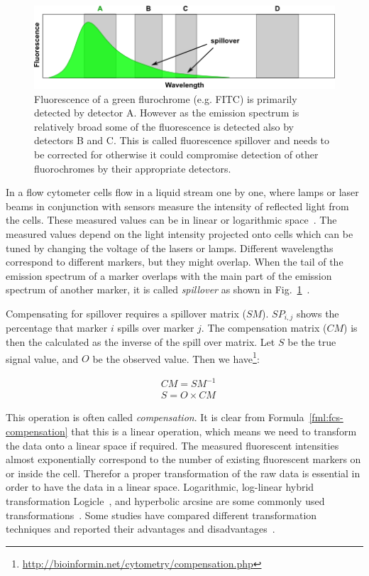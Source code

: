 \begin{figure}[!ht]
  \centering
  \includegraphics[width=.8\textwidth]{figs/FITC_spillover_onLSRII_s}
  \caption[Flow Cytometry Spillover Effect]{Fluorescence of a green flurochrome (e.g. FITC) is primarily detected by detector A. However as the emission spectrum is relatively broad some of the fluorescence is detected also by detectors B and C. This is called fluorescence spillover and needs to be corrected for otherwise it could compromise detection of other fluorochromes by their appropriate detectors\footnotemark[1].}
  \label{fig:flow-cytometry-spillover}
\end{figure}

In a flow cytometer cells flow in a liquid stream one by one, where lamps or laser beams in conjunction with sensors measure the intensity of reflected light from the cells. These measured values can be in linear or logarithmic space~\cite{practical-flow-cytometry-book}. The measured values depend on the light intensity projected onto cells which can be tuned by changing the voltage of the lasers or lamps. Different wavelengths correspond to different markers, but they might overlap. When the tail of the emission spectrum of a marker overlaps with the main part of the emission spectrum of another marker, it is called \emph{spillover} as shown in Fig.~\ref{fig:flow-cytometry-spillover}~\cite{flow-cytometry-compensation}.

Compensating for spillover requires a spillover matrix ($SM$). $SP_{i,j}$ shows the percentage that marker $i$ spills over marker $j$. The compensation matrix ($CM$) is then the calculated as the inverse of the spill over matrix. Let $S$ be the true signal value, and $O$ be the observed value. Then we have\footnote{\url{http://bioinformin.net/cytometry/compensation.php}}:

\begin{align}
  &CM = SM^{-1} \nonumber \\
  &S = O \times CM
  \label{fml:fcs-compensation}
\end{align}

This operation is often called \emph{compensation}. It is clear from Formula~\ref{fml:fcs-compensation} that this is a linear operation, which means we need to transform the data onto a linear space if required. The measured fluorescent intensities almost exponentially correspond to the number of existing fluorescent markers on or inside the cell. Therefor a proper transformation of the raw data is essential in order to have the data in a linear space. Logarithmic, log-linear hybrid transformation Logicle~\cite{fcs-logicle}, and hyperbolic arcsine are some commonly used transformations~\cite{o2013flow}. Some studies have compared different transformation techniques and reported their advantages and disadvantages~\cite{fcs-transformation-survey1, fcs-transformation-survey2}.

